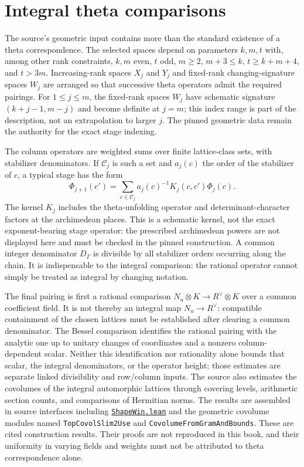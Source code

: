 \documentclass[11pt,openany,oneside]{scrbook}
\theoremstyle{definition}
\theoremstyle{remark}
\newcommand{\baseurl}{https://github.com/CocoSgt/riemann-hypothesis-lean/blob/7cbf7a0c32fca1badf05931879a37c3f8a2b03b4/}
\newcommand{\sourcefile}[2]{\href{\baseurl#1}{\texttt{#2}}}
\begin{document}
\section{Integral theta comparisons}\label{app:theta-technical}

The source's geometric input contains more than the standard existence of a theta correspondence.  The selected spaces depend on parameters $k,m,t$ with, among other rank constraints, $k,m$ even, $t$ odd, $m\ge2$, $m+3\le k$, $t\ge k+m+4$, and $t>3m$. Increasing-rank spaces $X_j$ and $Y_j$ and fixed-rank changing-signature spaces $W_j$ are arranged so that successive theta operators admit the required pairings.  For $1\le j\le m$, the fixed-rank spaces $W_j$ have schematic signature $(k+j-1,m-j)$ and become definite at $j=m$; this index range is part of the description, not an extrapolation to larger $j$. The pinned geometric data remain the authority for the exact stage indexing.

The column operators are weighted sums over finite lattice-class sets, with stabilizer denominators.  If $\mathcal C_j$ is such a set and $a_j(c)$ the order of the stabilizer of $c$, a typical stage has the form
\[
\Phi_{j+1}(c')=\sum_{c\in\mathcal C_j}a_j(c)^{-1}K_j(c,c')\Phi_j(c).
\]
The kernel $K_j$ includes the theta-unfolding operator and determinant-character factors at the archimedean places. This is a schematic kernel, not the exact exponent-bearing stage operator: the prescribed archimedean powers are not displayed here and must be checked in the pinned construction. A common integer denominator $D_\Gamma$ is divisible by all stabilizer orders occurring along the chain.  It is indispensable to the integral comparison: the rational operator cannot simply be treated as integral by changing notation.

The final pairing is first a rational comparison $N_u\otimes K\to R^\vee\otimes K$ over a common coefficient field. It is not thereby an integral map $N_u\to R^\vee$: compatible containment of the chosen lattices must be established after clearing a common denominator. The Bessel comparison identifies the rational pairing with the analytic one up to unitary changes of coordinates and a nonzero column-dependent scalar. Neither this identification nor rationality alone bounds that scalar, the integral denominators, or the operator height; those estimates are separate linked divisibility and row/column inputs.  The source also estimates the covolumes of the integral automorphic lattices through covering levels, arithmetic section counts, and comparisons of Hermitian norms.  The results are assembled in source interfaces including
\sourcefile{src/Development/AutomorphicArithmetic/CharacterBoxes/ShapeWin.lean}{ShapeWin.lean} and the geometric covolume modules named \texttt{TopCovolSlim2Use} and \texttt{CovolumeFromGramAndBounds}.  These are cited construction results.  Their proofs are not reproduced in this book, and their uniformity in varying fields and weights must not be attributed to theta correspondence alone.
\end{document}
